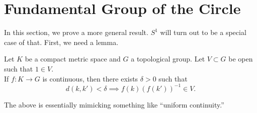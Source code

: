 \documentclass[12pt]{article}
\begin{document}
\section{Fundamental Group of the Circle}
In this section, we prove a more general result. $S^1$ will turn out to be a special case of that. First, we need a lemma.
\begin{lem} \label{lem:unifcont}
	Let $K$ be a compact metric space and $G$ a topological group. Let $V \subset G$ be open such that $1 \in V.$\\
	If $f:K\to G$ is continuous, then there exists $\delta > 0$ such that 
	\begin{equation*} 
		d(k, k') < \delta \implies f(k)(f(k'))^{-1} \in V.
	\end{equation*}
\end{lem}
The above is essentially mimicking something like ``uniform continuity.''
\end{document}
